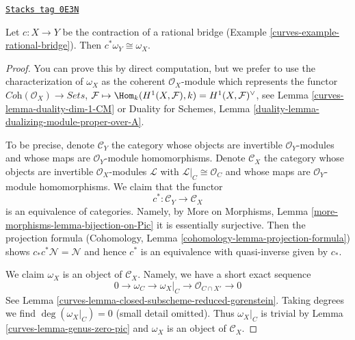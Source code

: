 \begin{lemma}
\label{curves-lemma-rational-bridge-canonical}
\href{https://stacks.math.columbia.edu/tag/0E3N}{\texttt{Stacks tag 0E3N}}

Let $c : X \to Y$ be the contraction of a rational bridge
(Example \ref{curves-example-rational-bridge}).
Then $c^*\omega_Y \cong \omega_X$.
\end{lemma}

\begin{proof}

You can prove this by direct computation, but we prefer to use the
characterization of $\omega_X$ as the coherent $\mathcal{O}_X$-module
which represents the functor
$\textit{Coh}(\mathcal{O}_X) \to \textit{Sets}$,
$\mathcal{F} \mapsto \Hom_k(H^1(X, \mathcal{F}), k) =
H^1(X, \mathcal{F})^\vee$, see
Lemma \ref{curves-lemma-duality-dim-1-CM} or
Duality for Schemes, Lemma
\ref{duality-lemma-dualizing-module-proper-over-A}.

\medskip\noindent
To be precise, denote $\mathcal{C}_Y$ the category whose objects are
invertible $\mathcal{O}_Y$-modules and whose maps are
$\mathcal{O}_Y$-module homomorphisms. Denote $\mathcal{C}_X$ the category
whose objects are invertible $\mathcal{O}_X$-modules $\mathcal{L}$ with
$\mathcal{L}|_C \cong \mathcal{O}_C$ and whose maps are
$\mathcal{O}_Y$-module homomorphisms. We claim that the functor
$$
c^* : \mathcal{C}_Y \to \mathcal{C}_X
$$
is an equivalence of categories. Namely, by
More on Morphisms, Lemma \ref{more-morphisms-lemma-bijection-on-Pic}
it is essentially surjective. Then the projection formula
(Cohomology, Lemma \ref{cohomology-lemma-projection-formula})
shows $c_*c^*\mathcal{N} = \mathcal{N}$ and hence $c^*$
is an equivalence with quasi-inverse given by $c_*$.

\medskip\noindent
We claim $\omega_X$ is an object of $\mathcal{C}_X$. Namely, we have a
short exact sequence
$$
0 \to \omega_C \to \omega_X|_C \to \mathcal{O}_{C \cap X'} \to 0
$$
See Lemma \ref{curves-lemma-closed-subscheme-reduced-gorenstein}.
Taking degrees we find $\deg(\omega_X|_C) = 0$ (small detail omitted).
Thus $\omega_X|_C$ is trivial by Lemma \ref{curves-lemma-genus-zero-pic}
and $\omega_X$ is an object of $\mathcal{C}_X$.


\end{proof}
